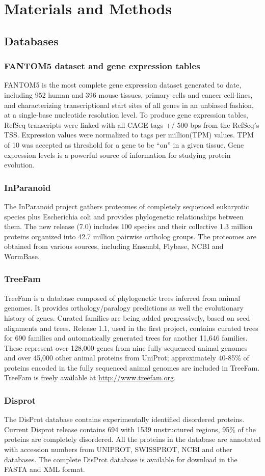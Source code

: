 \documentclass[11pt, a4paper,oneside]{report}
\newcommand{\mychapter}[2]{
    \setcounter{chapter}{#1}
    \setcounter{section}{0}
    \chapter*{#2}
    \addcontentsline{toc}{chapter}{#2}
}
\begin{document}
\mychapter{2}{Materials and Methods}
\section{Databases}
\subsection{FANTOM5 dataset and gene expression tables}
FANTOM5 is the most complete gene expression dataset generated to date, including 952 human and 396 mouse tissues, primary cells and cancer cell-lines, and characterizing transcriptional start sites of all genes in an unbiased fashion, at a single-base nucleotide resolution level. To produce gene expression tables, RefSeq transcripts were linked with all CAGE tags +/-500 bps from the RefSeqʼs TSS. Expression values were normalized to tags per million(TPM) values. TPM of 10 was accepted as threshold for a gene to be “on” in a given tissue. Gene expression levels is a powerful source of information for studying protein evolution. 
\subsection{InParanoid}
The InParanoid project gathers proteomes of completely sequenced eukaryotic species plus Escherichia coli and provides phylogenetic relationships between them. The new release (7.0)\cite{Ostlund2010} includes 100 species and their collective 1.3 million proteins organized into 42.7 million pairwise ortholog groups. The proteomes are obtained from various sources, including Ensembl, Flybase, NCBI and WormBase. 
\subsection{TreeFam}
TreeFam is a database composed of phylogenetic trees inferred from animal genomes. It provides orthology/paralogy predictions as well the evolutionary history of genes. Curated families are being added progressively, based on seed alignments and trees. Release 1.1\cite{Li2006}, used in the first project, contains curated trees for 690 families and automatically generated trees for another 11,646 families. These represent over 128,000 genes from nine fully sequenced animal genomes and over 45,000 other animal proteins from UniProt; approximately 40-85\% of proteins encoded in the fully sequenced animal genomes are included in TreeFam. TreeFam is freely available at \url{http://www.treefam.org}.
\subsection{Disprot}
The DisProt database contains experimentally identified disordered proteins\cite{Sickmeier2007}. Current Disprot release contains 694 with 1539 unstructured regions, 95\% of the proteins are completely disordered. All the proteins in the database are annotated with accession numbers from UNIPROT, SWISSPROT, NCBI and other databases. The complete DisProt database is available for download in the FASTA and XML format.
\end{document}

